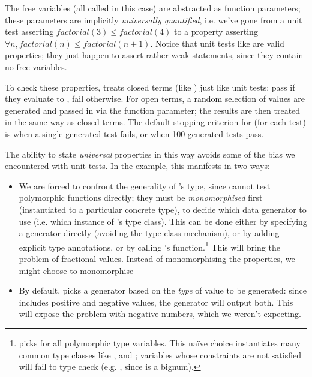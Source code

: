 The free variables (all called  in this case) are abstracted as function
parameters; these parameters are implicitly \emph{universally quantified},
i.e. we've gone from a unit test asserting $factorial(3) \leq factorial(4)$ to a
property asserting $\forall n, factorial(n) \leq factorial(n+1)$. Notice that
unit tests like  are valid properties; they just happen to assert
rather weak statements, since they contain no free variables.

To check these properties, \quickcheck{} treats closed terms (like )
just like unit tests: pass if they evaluate to , fail otherwise. For
open terms, a random selection of values are generated and passed in via the
function parameter; the results are then treated in the same way as closed
terms. The default stopping criterion for \quickcheck{} (for each test) is when a
single generated test fails, or when 100 generated tests pass.

The ability to state \emph{universal} properties in this way avoids some of the
bias we encountered with unit tests. In the  example, this
manifests in two ways:

\begin{itemize}
\item We are forced to confront the generality of 's type, since
  \quickcheck{} cannot test polymorphic functions directly; they must be
  \emph{monomorphised} first (instantiated to a particular concrete type), to
  decide which data generator to use (i.e. which instance of \quickcheck{}'s
   type class). This can be done either by specifying a generator
  directly (avoiding the type class mechanism), or by adding explicit type
  annotations, or by calling \quickcheck{}'s 
  function.\footnote{ picks  for all polymorphic
    type variables. This na\"ive choice instantiates many common type classes
    like ,  and ; variables whose constraints are not
    satisfied will fail to type check (e.g. , since  is
    a bignum).} This will bring the problem of fractional values. Instead of
  monomorphising the properties, we might choose to monomorphise 

\item By default, \quickcheck{} picks a generator based on the \emph{type} of
  value to be generated: since  includes positive and negative values,
  the  generator will output both. This will expose the problem with
  negative numbers, which we weren't expecting.
\end{itemize}

